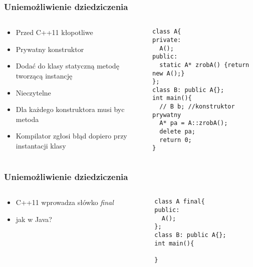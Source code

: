 \documentclass[10pt]{beamer}
\begin{document}
\begin{frame}[fragile]
  \frametitle{Uniemożliwienie dziedziczenia}
  \begin{columns}
    \begin{column}{0.6\textwidth}
    \begin{itemize}
  \item Przed C++11 kłopotliwe
  \item Prywatny konstruktor
  \item Dodać do klasy statyczną metodę tworzącą instancję
  \item Nieczytelne
  \item Dla każdego konstruktora musi byc metoda
  \item Kompilator zgłosi błąd dopiero przy instantacji klasy
\end{itemize}
    \end{column}
    \begin{column}{0.47\textwidth}
      \begin{lstlisting}
class A{
private:
  A();
public:
  static A* zrobA() {return new A();}
};
class B: public A{};
int main(){
  // B b; //konstruktor prywatny
  A* pa = A::zrobA();
  delete pa;
  return 0;
}

\end{lstlisting}
    \end{column}
  \end{columns}
\end{frame}

\begin{frame}[fragile]
  \frametitle{Uniemożliwienie dziedziczenia}
  \begin{columns}
    \begin{column}{0.6\textwidth}
    \begin{itemize}
  \item C++11 wprowadza słówko \textit{final}
  \item jak w Java?
\end{itemize}
    \end{column}
    \begin{column}{0.47\textwidth}
      \begin{lstlisting}
class A final{
public:
  A();
};
class B: public A{};
int main(){
  
}
\end{lstlisting}
    \end{column}
  \end{columns}
\end{frame}
\end{document}
